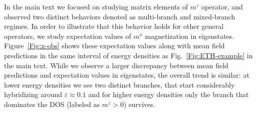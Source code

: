 \documentclass[aps,prx,showpacs,amsmath,amssymb,superscriptaddress,twocolumn,longbibliography,10pt,nofootinbib]{revtex4-2}
\begin{document}
In the main text we focused on studying matrix elements of $m^z$ operator, and observed two distinct behaviors denoted as multi-branch and mixed-branch regimes. In order to illustrate that this behavior holds for other general operators, we study expectation values of $m^x$ magnetization in eigenstates. Figure~\ref{Fig:x-obs} shows these expectation values along with mean field predictions in the same interval of energy densities as Fig.~\ref{Fig:ETH-example} in the main text. While we observe a larger discrepancy between mean field predictions and expectation values in eigenstates, the overall trend is similar: at lower energy densities we see two distinct branches, that start considerably hybridizing around $\varepsilon\approx 0.1$ and for higher energy densities only the branch that dominates the DOS (labeled as $m^z>0$) survives. 




\end{document}
